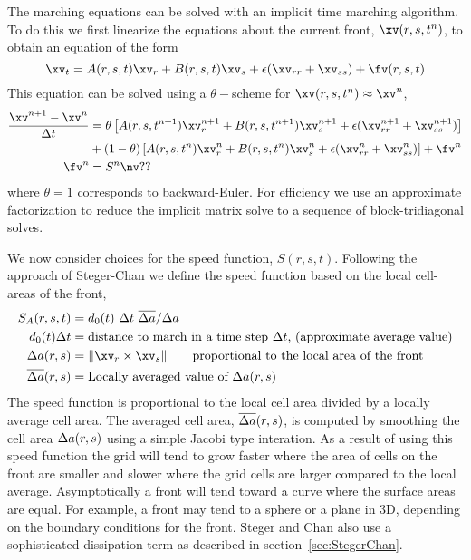 The marching equations can be solved with an implicit time marching algorithm.
To do this we first linearize the equations about the current front, $\xv(r,s,t^n)$, to obtain
an equation of the form
\[
  \xv_t = A(r,s,t)  \xv_r + B(r,s,t) \xv_s  + \epsilon( \xv_{rr} + \xv_{ss} ) + \fv(r,s,t)
\]
This equation can be solved using a $\theta-$scheme for $\xv(r,s,t^n)\approx \xv^n$,
\begin{align*}
  { \xv^{n+1} - \xv^n \over \Delta t} &= 
       \theta\left[ A(r,s,t^{n+1}) \xv_r^{n+1} + B(r,s,t^{n+1}) \xv_s^{n+1} 
           + \epsilon ( \xv_{rr}^{n+1} + \xv_{ss}^{n+1} )\right]  \\
 & + (1-\theta) \left[ A(r,s,t^{n}) \xv_r^{n} + B(r,s,t^{n}) \xv_s^{n} 
            + \epsilon ( \xv_{rr}^{n} + \xv_{ss}^{n} )\right] + \fv^n \\
  \fv^n &=  S^n \nv \mbox{??}
\end{align*}
where $\theta=1$ corresponds to backward-Euler. For efficiency we use
an approximate factorization to reduce the implicit matrix solve to a sequence
of block-tridiagonal solves. 

We now consider choices for the speed function, $S(r,s,t)$.
Following the approach of Steger-Chan we define the speed function based on the 
local cell-areas of the front,
\begin{align*}
 S_A(r,s,t) & =  d_0(t) ~\Delta t ~ \das / \da  \\
 d_0(t) \Delta t  &= \mbox{distance to march in a time step $\Delta t$, (approximate average value)} \\
 \da(r,s) &= \| \xv_r \times \xv_s \|  \qquad \mbox{proportional to the local area of the front}\\
 \das(r,s) &= \mbox{Locally averaged value of $\da(r,s)$}
\end{align*}
The speed function is proportional to the local cell area divided by a
locally average cell area.  The averaged cell area, $\overline{\Delta a}(r,s)$, is
computed by smoothing the cell area $\Delta a(r,s)$ using a simple Jacobi
type interation.  As a result of using this speed function the grid
will tend to grow faster where the area of cells on the front are
smaller and slower where the grid cells are larger compared to the
local average. Asymptotically a front will tend toward a curve where
the surface areas are equal. For example, a front may tend to a sphere
or a plane in 3D, depending on the boundary conditions for the front.
Steger and Chan also use a sophisticated dissipation term as described in section~\ref{sec:StegerChan}.

